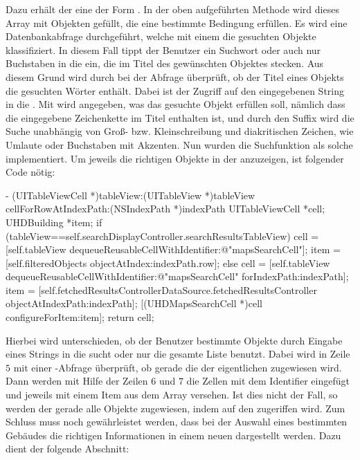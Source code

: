 \documentclass{report}
\begin{document}
Dazu erhält der  eine  der Form . In der oben aufgeführten Methode wird dieses Array mit Objekten gefüllt, die eine bestimmte Bedingung erfüllen. Es wird eine Datenbankabfrage durchgeführt, welche mit einem  die gesuchten Objekte klassifiziert. In diesem Fall tippt der Benutzer ein Suchwort oder auch nur Buchstaben in die  ein, die im Titel des gewünschten Objektes stecken. Aus diesem Grund wird durch  bei der Abfrage überprüft, ob der Titel eines Objekts die gesuchten Wörter enthält. Dabei ist  der Zugriff auf den eingegebenen String in die . Mit  wird angegeben, was das gesuchte Objekt erfüllen soll, nämlich dass die eingegebene Zeichenkette im Titel enthalten ist, und durch den Suffix \objc{[cd]} wird die Suche unabhängig von Groß- bzw. Kleinschreibung und diakritischen Zeichen, wie Umlaute oder Buchstaben mit Akzenten. Nun wurden die Suchfunktion als solche implementiert. Um jeweils die richtigen Objekte in der  anzuzeigen, ist folgender Code nötig:

\begin{objclst}
- (UITableViewCell *)tableView:(UITableView *)tableView cellForRowAtIndexPath:(NSIndexPath *)indexPath
{
	UITableViewCell *cell;
    UHDBuilding *item;
    if (tableView==self.searchDisplayController.searchResultsTableView) {
        cell = [self.tableView dequeueReusableCellWithIdentifier:@"mapsSearchCell"];
        item = [self.filteredObjects objectAtIndex:indexPath.row];
    } else {
		cell = [self.tableView dequeueReusableCellWithIdentifier:@"mapsSearchCell" forIndexPath:indexPath];
		item = [self.fetchedResultsControllerDataSource.fetchedResultsController objectAtIndexPath:indexPath];
    }
    [(UHDMapsSearchCell *)cell configureForItem:item];
	return cell;
}
\end{objclst}

Hierbei wird unterschieden, ob der Benutzer bestimmte Objekte durch Eingabe eines Strings in die  sucht oder nur die gesamte Liste benutzt. Dabei wird in Zeile $5$ mit einer -Abfrage überprüft, ob gerade die  der eigentlichen  zugewiesen wird. Dann werden mit Hilfe der Zeilen $6$ und $7$ die Zellen mit dem Identifier  eingefügt und jeweils mit einem Item aus dem Array  versehen. Ist dies nicht der Fall, so werden der  gerade alle Objekte zugewiesen, indem auf den  zugeriffen wird. Zum Schluss muss noch gewährleistet werden, dass bei der Auswahl eines bestimmten Gebäudes die richtigen Informationen in einem neuen  dargestellt werden. Dazu dient der folgende Abschnitt:
\end{document}
